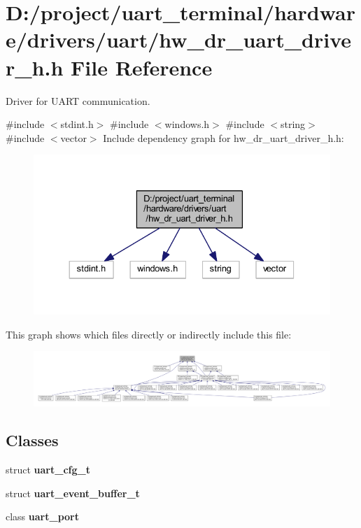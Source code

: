 \section{D\+:/project/uart\+\_\+terminal/hardware/drivers/uart/hw\+\_\+dr\+\_\+uart\+\_\+driver\+\_\+h.h File Reference}
\label{hw__dr__uart__driver__h_8h}


Driver for U\+A\+RT communication.  


{\ttfamily \#include $<$stdint.\+h$>$}\newline
{\ttfamily \#include $<$windows.\+h$>$}\newline
{\ttfamily \#include $<$string$>$}\newline
{\ttfamily \#include $<$vector$>$}\newline
Include dependency graph for hw\+\_\+dr\+\_\+uart\+\_\+driver\+\_\+h.\+h\+:
\nopagebreak
\begin{figure}[H]
\begin{center}
\leavevmode
\includegraphics[width=330pt]{hw__dr__uart__driver__h_8h__incl}
\end{center}
\end{figure}
This graph shows which files directly or indirectly include this file\+:
\nopagebreak
\begin{figure}[H]
\begin{center}
\leavevmode
\includegraphics[width=350pt]{hw__dr__uart__driver__h_8h__dep__incl}
\end{center}
\end{figure}
\subsection*{Classes}
\begin{DoxyCompactItemize}
\item 
struct \textbf{ uart\+\_\+cfg\+\_\+t}
\item 
struct \textbf{ uart\+\_\+event\+\_\+buffer\+\_\+t}
\item 
class \textbf{ uart\+\_\+port}
\end{DoxyCompactItemize}
